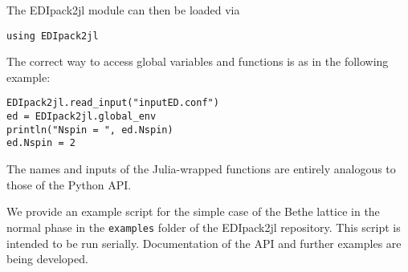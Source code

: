 \documentclass[edipack_sp.tex]{subfiles}
\begin{document}
The EDIpack2jl module can then be loaded via
\begin{lstlisting}[style=myjulia]
using EDIpack2jl
\end{lstlisting}
%
The correct way to access global variables and functions is as in the following example:
\begin{lstlisting}[style=myjulia]
EDIpack2jl.read_input("inputED.conf")
ed = EDIpack2jl.global_env
println("Nspin = ", ed.Nspin)
ed.Nspin = 2
\end{lstlisting}

The names and inputs of the Julia-wrapped functions are entirely analogous to those of the Python API.

We provide an example script for the simple case of the Bethe lattice in the normal phase in the {\tt examples} folder of the EDIpack2jl repository. This script is intended to be run serially. Documentation of the API and further examples are being developed.



\ifSubfilesClassLoaded{
  
}{}
\end{document}
